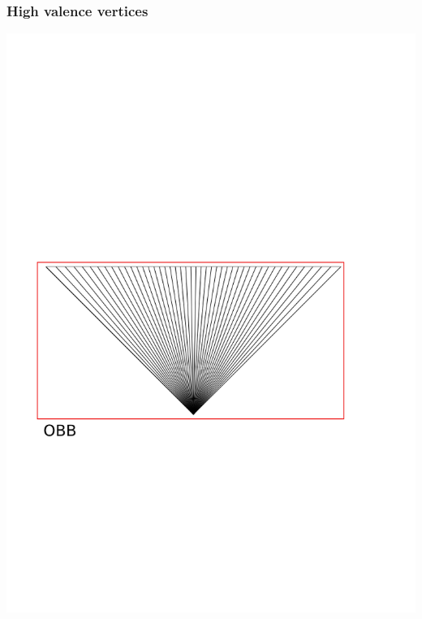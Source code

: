 \documentclass[14pt]{beamer}
\begin{document}
\begin{frame}
\frametitle{High valence vertices}
\begin{center}
\includegraphics[scale=0.6, trim = 0 0 0 300]{HV_1.png}
\end{center}
\end{frame}
\end{document}
